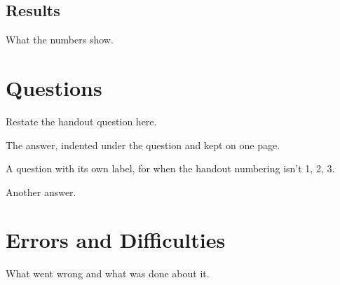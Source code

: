 \documentclass{lennylab}
\begin{document}

\subsection{Results}

What the numbers show.

\section*{Questions}

\begin{question}
  Restate the handout question here.
\end{question}
\begin{answer}
  The answer, indented under the question and kept on one page.
\end{answer}

\begin{question}[Q2b]
  A question with its own label, for when the handout numbering isn't 1, 2, 3.
\end{question}
\begin{answer}
  Another answer.
\end{answer}

\section*{Errors and Difficulties}

What went wrong and what was done about it.
\end{document}
